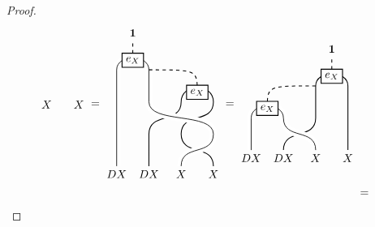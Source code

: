 \documentclass[11pt, reqno]{amsart}
\theoremstyle{definition}\newtheorem{defi}[thm]{Definition}
\theoremstyle{definition}\newtheorem{rem}[thm]{Remark}
\theoremstyle{definition}\newtheorem{exam}[thm]{Example}
\theoremstyle{definition}\newtheorem{assum}[thm]{Assumption}
\newcommand{\vac}{\mathbf{1}}
\begin{document}
\begin{proof}
\begin{align*}
\begin{matrix}
\begin{tikzpicture}[scale = 1, baseline = {(current bounding box.center)}, line width=0.75pt]
      \node at (2,-.25) {$X$};
      \node at (3,-.25) {$X$};
        \end{tikzpicture}
   \end{matrix} =
   \begin{matrix}
    \begin{tikzpicture}[scale = 1, baseline = {(current bounding box.center)}, line width=0.75pt]
        \draw (1,0) -- (1,1) .. controls (1,1.7) and (2,1.3) .. (2,2) .. controls (2,2.6) and (3,2.6) .. (3,2) .. controls (3,1.3) and (2,1.7) .. (2,1) .. controls (2,.3) and (3,.7) .. (3,0);
        \draw[white, double=black, line width = 3pt ] (0,0) -- (0,3) .. controls (0,3.5) and (1,3.5) .. (1,3) -- (1,2) .. controls (1,1.3) and (3,1.7) .. (3,1) .. controls (3,.3) and (2,.7) .. (2,0);
        \draw[dashed] (.5,3.3) -- (.5,3.9);
        \draw[dashed] (2.5,2.3) .. controls (2.5,3) .. (1,3);
              \node at (2.5,2.3) [draw,minimum width=10pt,minimum height=10pt,thick, fill=white] {$e_X$};
      \node at (.5,3.3) [draw,minimum width=10pt,minimum height=10pt,thick, fill=white] {$e_X$};
      \node at (.5,4.15) {$\vac$};
      \node at (0,-.25) {$DX$};
      \node at (1,-.25) {$DX$};
      \node at (2,-.25) {$X$};
      \node at (3,-.25) {$X$};
        \end{tikzpicture}
   \end{matrix} =
   \begin{matrix}
    \begin{tikzpicture}[scale = 1, baseline = {(current bounding box.center)}, line width=0.75pt]
        \draw (1,0) .. controls (1,.7) and (2,.3) .. (2,1) -- (2,2) .. controls (2,2.5) and (3,2.5) .. (3,2) -- (3,0);
        \draw[white, double=black, line width = 3pt ] (0,0) -- (0,1) .. controls (0,1.5) and (1,1.5) .. (1,1) .. controls (1,.3) and (2,.7) .. (2,0);
        \draw[dashed] (2.5,2.3) -- (2.5,2.9);
        \draw[dashed] (.5,1.3) .. controls (.5,2) .. (2,2);
              \node at (2.5,2.3) [draw,minimum width=10pt,minimum height=10pt,thick, fill=white] {$e_X$};
      \node at (.5,1.3) [draw,minimum width=10pt,minimum height=10pt,thick, fill=white] {$e_X$};
      \node at (2.5,3.15) {$\vac$};
      \node at (0,-.25) {$DX$};
      \node at (1,-.25) {$DX$};
      \node at (2,-.25) {$X$};
      \node at (3,-.25) {$X$};
        \end{tikzpicture}
   \end{matrix}\\
   & =
   \begin{matrix}
    \begin{tikzpicture}[scale = 1, baseline = {(current bounding box.center)}, line width=0.75pt]

\end{tikzpicture}
\end{matrix}
\end{align*}
\end{proof}
\end{document}
